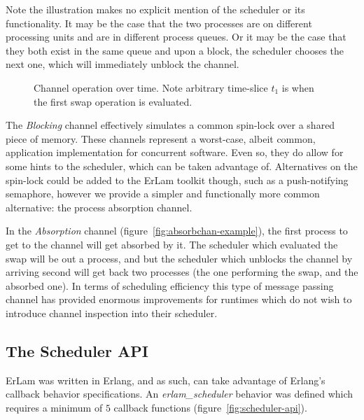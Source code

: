 Note the illustration makes no explicit mention of the scheduler or its 
functionality. It may be the case that the two processes are on different 
processing units and are in different process queues. 
Or it may be the case that they both exist in the
same queue and upon a block, the scheduler chooses the next one, which will 
immediately unblock the channel.

\begin{figure}
\caption{Channel operation over time. Note arbitrary time-slice $t_1$ is when the 
first swap operation is evaluated.}
\end{figure}

The {\sl Blocking} channel effectively simulates a common spin-lock over a shared 
piece of memory. These channels represent a worst-case, albeit common, application 
implementation for concurrent software. Even so, they do allow for some hints
to the scheduler, which can be taken advantage of. Alternatives on the spin-lock 
could be added to the ErLam toolkit though, such as a push-notifying semaphore, 
however we provide a simpler and functionally more common alternative: the process 
absorption channel.

In the {\sl Absorption} channel (figure~\ref{fig:absorbchan-example}), the first 
process to get to the channel will get absorbed by it. The scheduler which 
evaluated the swap will be out a process, and but the scheduler which unblocks the channel 
by arriving second will get back two processes (the one performing the swap, 
and the absorbed one). In terms of scheduling efficiency this type of message
passing channel has provided enormous improvements for runtimes which do not
wish to introduce channel inspection into their scheduler.

\subsection{The Scheduler API}\label{sec:the scheduler api}

ErLam was written in Erlang, and as such, can take advantage of Erlang's 
callback behavior specifications. An \emph{erlam\_scheduler} behavior was
defined which requires a minimum of $5$ callback functions 
(figure~\ref{fig:scheduler-api}).

